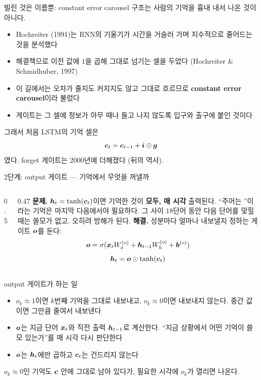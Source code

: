 \documentclass[aspectratio=169,11pt]{beamer}
\begin{document}
\begin{frame}{빌린 것은 이름뿐: constant error carousel}
구조는 사람의 기억을 흉내 내서 나온 것이 아니다.
\begin{itemize}
\item Hochreiter (1991)는 RNN의 기울기가 시간을 거슬러 가며 지수적으로 줄어드는 것을 분석했다
\item 해결책으로 이전 값에 $1$을 곱해 그대로 넘기는 셀을 두었다 (Hochreiter \& Schmidhuber, 1997)
\item 이 길에서는 오차가 줄지도 커지지도 않고 그대로 흐르므로 \textbf{constant error carousel}이라 불렀다
\item 게이트는 그 셀에 정보가 아무 때나 들고 나지 않도록 입구와 출구에 붙인 것이다
\end{itemize}
\vskip2mm
그래서 처음 LSTM의 기억 셀은
\[
\bm{c}_t=\bm{c}_{t-1}+\bm{i}\odot\bm{g}
\]
였다. forget 게이트는 2000년에 더해졌다 (뒤의 역사).
\end{frame}

\begin{frame}{2단계: output 게이트 --- 기억에서 무엇을 꺼낼까}
\begin{columns}[c,onlytextwidth]
\begin{column}{0.5\textwidth}
\end{column}
\begin{column}{0.47\textwidth}
\small
\textbf{문제.} $\bm{h}_t=\tanh(\bm{c}_t)$이면 기억한 것이 \textbf{모두, 매 시각} 출력된다.
``주어는 ''이라는 기억은 마지막  다음에서야 필요하다.
그 사이 $18$단어 동안 다음 단어를 맞힐 때는 쓸모가 없고, 오히려 방해가 된다.
\vskip3mm
\textbf{해결.} 성분마다 얼마나 내보낼지 정하는 게이트 $\bm{o}$를 둔다:
\[
\bm{o}=\sigma(\bm{x}_tW_x^{(o)}+\bm{h}_{t-1}W_h^{(o)}+\bm{b}^{(o)})
\]
\[
\bm{h}_t=\bm{o}\odot\tanh(\bm{c}_t)
\]
\end{column}
\end{columns}
\end{frame}

\begin{frame}{output 게이트가 하는 일}
\begin{itemize}
\item $o_k\approx1$이면 $k$번째 기억을 그대로 내보내고, $o_k\approx0$이면 내보내지 않는다.
중간 값이면 그만큼 줄여서 내보낸다
\item $\bm{o}$는 지금 단어 $\bm{x}_t$와 직전 출력 $\bm{h}_{t-1}$로 계산한다.
``지금 상황에서 어떤 기억이 쓸모 있는가''를 매 시각 다시 판단한다
\item $\bm{o}$는 $\bm{h}_t$에만 곱하고 $\bm{c}_t$는 건드리지 않는다
\end{itemize}
\vskip3mm
\begin{keybox}
$o_k\approx0$인 기억도 $\bm{c}$ 안에 그대로 남아 있다가, 필요한 시각에 $o_k$가 열리면 나온다.
\end{keybox}
\end{frame}
\end{document}
